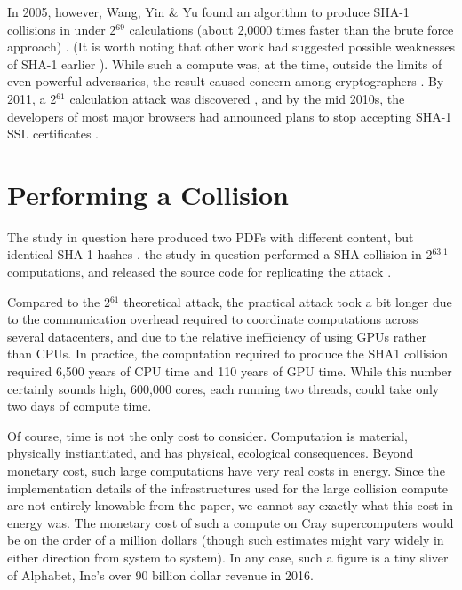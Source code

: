 \documentclass[sigconf]{acmart}
\begin{document}
In 2005, however, Wang, Yin \& Yu found an algorithm to produce SHA-1 collisions in under 2\(^{\text{69}}\) calculations (about 2,0000 times faster than the brute force approach)
\cite{Wang2005}.
(It is worth noting that other work had suggested possible weaknesses of SHA-1 earlier \cite{Biham2005}).
While such a compute was, at the time, outside the limits of even powerful adversaries,
the result caused concern among cryptographers \cite{Schneier2005}.
By 2011, a 2\(^{\text{61}}\) calculation attack was discovered \cite{Stevens2013a},
and by the mid 2010s, the developers of most major browsers had announced plans to stop accepting SHA-1 SSL certificates 
\cite{Mozilla2017,Sleevi2014}.

\section{Performing a Collision}
\label{sec:orgda98255}

The study in question here produced two PDFs with different content, but identical SHA-1 hashes
\cite{Stevens2017}.
the study in question performed a SHA collision in 2\(^{\text{63.1}}\) computations, 
and released the source code for replicating the attack
\cite{Stevens2017github}.

Compared to the 2\(^{\text{61}}\) theoretical attack, the practical attack took a bit longer due to the communication overhead required to coordinate computations across several datacenters, and due to the relative inefficiency of using GPUs rather than CPUs.
In practice, the computation required to produce the SHA1 collision required 6,500 years of CPU time and 110 years of GPU time. While this number certainly sounds high, 600,000 cores, each running two threads, could take only two days of compute time.

Of course, time is not the only cost to consider.
Computation is material, physically instiantiated, and has physical, ecological consequences.
Beyond monetary cost, such large computations have very real costs in energy.
Since the implementation details of the infrastructures used for the large collision compute are not entirely knowable from the paper,
we cannot say exactly what this cost in energy was.
The monetary cost of such a compute on Cray supercomputers would be on the order of a million dollars
\cite{Pautsch2016}
(though such estimates might vary widely in either direction from system to system).
In any case, such a figure is a tiny sliver of Alphabet, Inc's over 90 billion dollar revenue in 2016.
\end{document}
